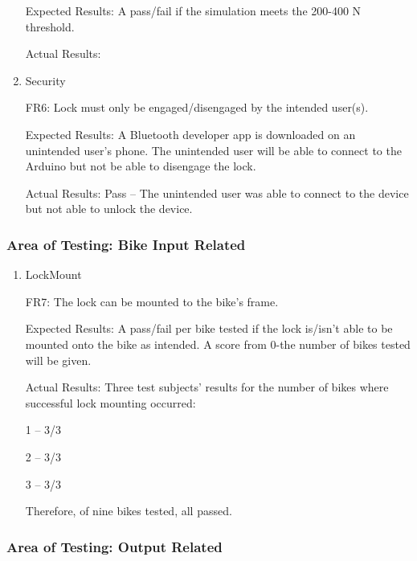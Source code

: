 \documentclass[12pt, titlepage]{article}
\begin{document}
\begin{enumerate}
Expected Results: A pass/fail if the simulation meets the 200-400 N threshold. 

Actual Results:

\item{Security

FR6: Lock must only be engaged/disengaged by the intended user(s). }

Expected Results: A Bluetooth developer app is downloaded on an unintended user’s phone. The unintended user will be able to connect to the Arduino but not be able to disengage the lock. 

Actual Results: Pass -- The unintended user was able to connect to the device but not able to unlock the device. 

\end{enumerate}

\subsubsection{Area of Testing: Bike Input Related}

\begin{enumerate}

\item{LockMount

FR7: The lock can be mounted to the bike’s frame. }

Expected Results: A pass/fail per bike tested if the lock is/isn’t able to be mounted onto the bike as intended. A score from 0-the number of bikes tested will be given.  

Actual Results: Three test subjects’ results for the number of bikes where successful lock mounting occurred: 

1 – 3/3 

2 – 3/3 

3 – 3/3 

Therefore, of nine bikes tested, all passed. 

\end{enumerate}

\subsubsection{Area of Testing: Output Related}
\end{document}
